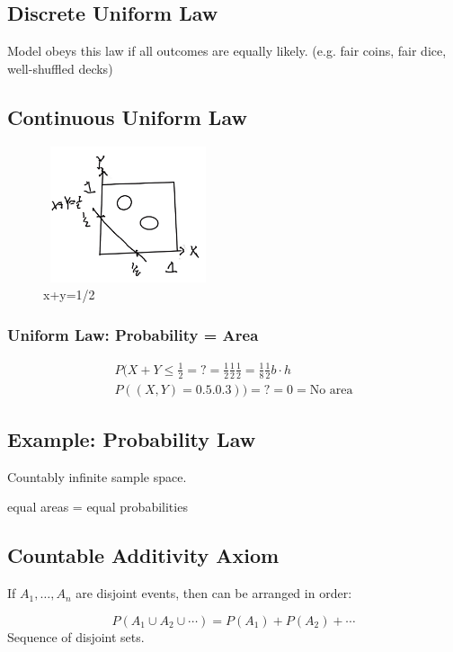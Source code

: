 \subsection{Discrete Uniform Law}

Model obeys this law if all outcomes are equally likely. (e.g. fair coins, fair dice, well-shuffled decks)

\subsection{Continuous Uniform Law}

\begin{figure}[!ht]
\centering
\includegraphics[width=5cm, height=4cm]{images/L01/cont_unif_law.jpeg}
\caption{x+y=1/2}
\end{figure}

\subsubsection{Uniform Law: Probability = Area}

\begin{align*}
P(X+Y \le \frac{1}{2}=? = \frac{1}{2} \frac{1}{2}\frac{1}{2} = \frac{1}{8}\frac{1}{2}b\cdot h\\
P((X,Y) = 0.5.0.3))= ? = 0 = \text{No area}
\end{align*}





\subsection{Example: Probability Law}

Countably infinite sample space.

equal areas = equal probabilities

\subsection{Countable Additivity Axiom}

If $A_1,\ldots, A_n$ are disjoint events, then can be arranged in order:

$$
P(A_1 \cup A_2 \cup \cdots) = P(A_1) + P(A_2) + \cdots
$$
Sequence of disjoint sets.
